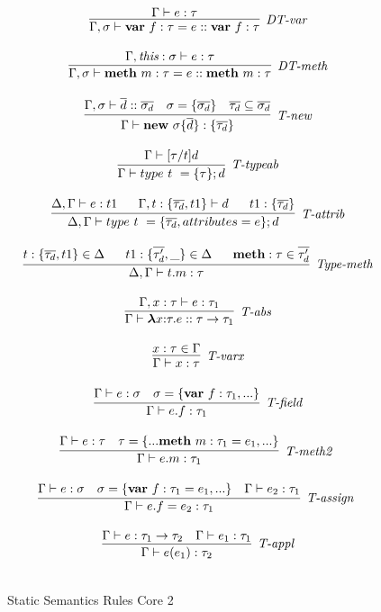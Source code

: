 \begin{figure}
\centering
\[
\begin{array}{c}
\infer[\textit{DT-var}]
	{\Gamma,\sigma \vdash \keyw{var}~ f:\tau = e :: \keyw{var}~ f:\tau }
	{\Gamma \vdash e : \tau} \\[3ex]
	
\infer[\textit{DT-meth}]
	{\Gamma,\sigma \vdash \keyw{meth}~ m:\tau = e :: \keyw{meth}~ m:\tau }
	{\Gamma,\textit{this}:\sigma \vdash e : \tau} \\[3ex]

\infer[\textit{T-new}]
	{\Gamma \vdash \keyw{new}~\sigma \{ \overline{d} \} : \{ \overline{\tau_d} \}}
	{\Gamma,\sigma \vdash \overline{d} :: \overline{\sigma_d} & \sigma = \{ \overline{\sigma_d} \} & \overline{\tau_d} \subseteq \overline{\sigma_d}} \\[3ex]

\infer[\textit{T-typeab}]
	{\Gamma \vdash  type~ t~=\{\tau\}; d} 
	{\Gamma \vdash [\tau/t]d }\\[3ex]

\infer[\textit{T-attrib}]
	{\Delta,\Gamma \vdash  type~ t~=\{\overline{\tau_d}, attributes=e\}; d} 
	{\Delta, \Gamma \vdash e:t1 ~~~~~ \Gamma,t:\{\overline{\tau_d},t1\} \vdash d ~~~~~ t1: \{\overline{\tau_d}\}  }\\[3ex]

\infer[\textit{Type-meth}]
	{\Delta, \Gamma \vdash  t.m:\tau} 
	{t : \{\overline{\tau_d}, t1\} \in \Delta ~~~~~ t1 : \{\overline{\tau'_d},\_\} \in \Delta ~~~~~ \keyw{meth}:\tau \in \overline{\tau'_d}   }\\[3ex]
	
\infer[\textit{T-abs}]
	{\Gamma \vdash  \boldsymbol\lambda x{:}\tau . e :: \tau \rightarrow \tau_1} 
	{\Gamma, x:\tau \vdash e:\tau_1 }\\[3ex]

\infer[\textit{T-varx}]
	{\Gamma \vdash x:\tau} 
	{x:\tau \in \Gamma }\\[3ex]

\infer[\textit{T-field}]
	{\Gamma \vdash  e.f:\tau_1} 
	{\Gamma \vdash e:\sigma & \sigma= \{\keyw{var}~ f:\tau_1,... \} }\\[3ex]

\infer[\textit{T-meth2 }]
	{\Gamma \vdash  e.m:\tau_1} 
	{\Gamma \vdash e:\tau & \tau=\{...\keyw{meth}~ m:\tau_1=e_1,... \} }\\[3ex]

\infer[\textit{T-assign }]
	{\Gamma \vdash  e.f=e_2:\tau_1} 
	{\Gamma \vdash e:\sigma & \sigma= \{\keyw{var}~ f:\tau_1=e_1,... \} & \Gamma\vdash e_2:\tau_1 }\\[3ex]

\infer[\textit{T-appl}]
	{\Gamma \vdash  e(e_1):\tau_2} 
	{\Gamma \vdash e:\tau_1 \rightarrow \tau_2 & \Gamma \vdash e_1:\tau_1}\\[3ex]

\end{array}
\]
\caption{Static Semantics Rules Core 2}
\end{figure}


